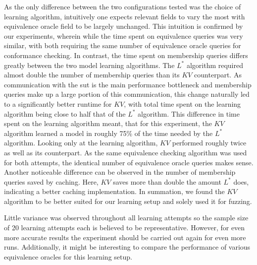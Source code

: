 As the only difference between the two configurations tested was the choice of learning algorithm, intuitively one expects relevant fields to vary the most with equivalence oracle field to be largely unchanged. This intuition is confirmed by our experiments, wherein while the time spent on equivalence queries was very similar, with both requiring the same number of equivalence oracle queries for conformance checking. In contrast, the time spent on membership queries differs greatly between the two model learning algorithms. The $L^*$ algorithm required almost double the number of membership queries than its $KV$ counterpart. As communication with the \ac{sut} is the main performance bottleneck and membership queries make up a large portion of this communication, this change naturally led to a significantly better runtime for $KV$, with total time spent on the learning algorithm being close to half that of the $L^*$ algorithm. This difference in time spent on the learning algorithm meant, that for this experiment, the $KV$ algorithm learned a model in roughly 75\% of the time needed by the $L^*$ algorithm. Looking only at the learning algorithm, $KV$ performed roughly twice as well as its counterpart. As the same equivalence checking algorithm was used for both attempts, the identical number of equivalence oracle queries makes sense. Another noticeable difference can be observed in the number of membership queries saved by caching. Here, $KV$ saves more than double the amount $L^*$ does, indicating a better caching implementation. In summation, we found the $KV$ algorithm to be better suited for our learning setup and solely used it for fuzzing. 

Little variance  was observed throughout all learning attempts so the sample size of 20 learning attempts each is believed to be representative. However, for even more accurate results the experiment should be carried out again for even more runs. Additionally, it might be interesting to compare the performance of various equivalence oracles for this learning setup.

